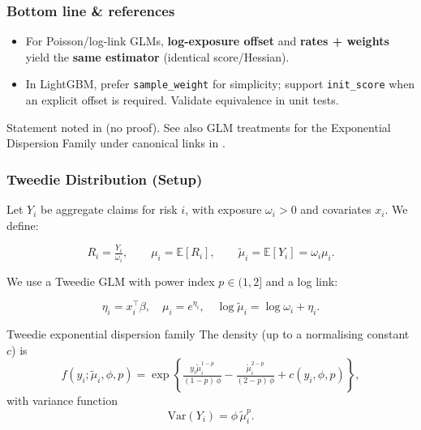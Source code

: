 \documentclass[10pt,aspectratio=169,xcolor={dvipsnames},usepdftitle=false]{beamer}
\begin{document}
\begin{frame}
\frametitle{Bottom line \& references}
\small
\begin{itemize}
\item For Poisson/log-link GLMs, \textbf{log-exposure offset} and \textbf{rates + weights} yield the \textbf{same estimator} (identical score/Hessian).
\item In LightGBM, prefer \texttt{sample\_weight} for simplicity; support \texttt{init\_score} when an explicit offset is required. Validate equivalence in unit tests.
\end{itemize}
\vspace{0.5em}
Statement noted in \cite{anders} (no proof). See also GLM treatments for the Exponential Dispersion Family under canonical links in \cite{glmbook}.
\end{frame}



\begin{frame}
\end{frame}

\begin{frame}
\frametitle{Tweedie Distribution (Setup)}

\small
Let $Y_i$ be aggregate claims for risk $i$, with exposure $\omega_i > 0$ and covariates $x_i$.
We define:

\[
R_i = \tfrac{Y_i}{\omega_i}, \qquad
\mu_i = \mathbb{E}[R_i], \qquad
\tilde{\mu}_i = \mathbb{E}[Y_i] = \omega_i \mu_i.
\]

We use a Tweedie GLM with power index $p \in (1,2]$ and a log link:

\[
\eta_i = x_i^\top \beta, \quad
\mu_i = e^{\eta_i}, \quad
\log \tilde{\mu}_i = \log \omega_i + \eta_i.
\]

\begin{exampleblock}{Tweedie exponential dispersion family}
The density (up to a normalising constant $c$) is
\[
f(y_i;\tilde{\mu}_i, \phi, p)
= \exp\left\{
\tfrac{y_i \tilde{\mu}_i^{1-p}}{(1-p)\,\phi}
- \tfrac{\tilde{\mu}_i^{2-p}}{(2-p)\,\phi}
+ c(y_i,\phi,p)
\right\},
\]
with variance function
\[
\mathrm{Var}(Y_i) = \phi \, \tilde{\mu}_i^{p}.
\]
\end{exampleblock}

\end{frame}
\end{document}
